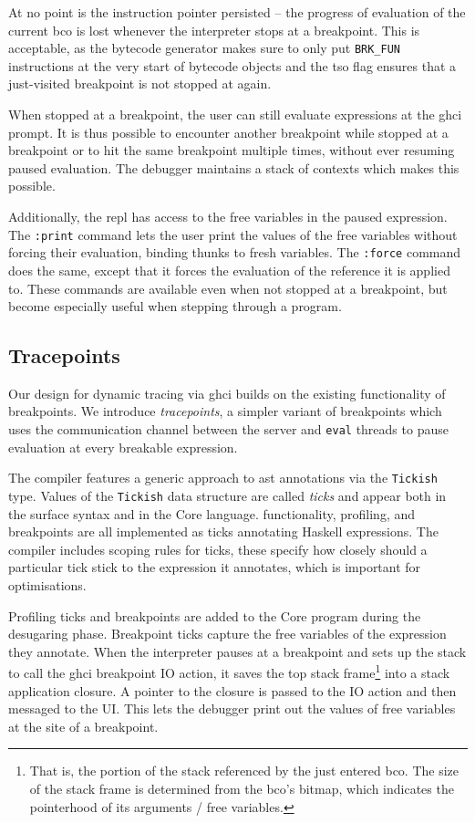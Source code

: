 \documentclass[thesis=B,english]{FITthesis}[2019/12/23]
\newcommand{\hsType}[1]{\texttt{#1}}
\begin{document}
At no point is the instruction pointer persisted -- the progress of evaluation
of the current \acrshort{bco} is lost whenever the interpreter stops at a
breakpoint. This is acceptable, as the bytecode generator makes sure to only
put \texttt{BRK\_FUN} instructions at the very start of bytecode objects and
the \acrshort{tso} flag ensures that a just-visited breakpoint is not stopped
at again.

When stopped at a breakpoint, the user can still evaluate expressions at the
\acrshort{ghci} prompt. It is thus possible to encounter another breakpoint
while stopped at a breakpoint or to hit the same breakpoint multiple times,
without ever resuming paused evaluation. The debugger maintains a stack of
contexts which makes this possible.

Additionally, the \acrshort{repl} has access to the free variables in the
paused expression. The \texttt{:print} command lets the user print the values
of the free variables without forcing their evaluation, binding thunks to fresh
variables. The \texttt{:force} command does the same, except that it forces the
evaluation of the reference it is applied to. These commands are available even
when not stopped at a breakpoint, but become especially useful when stepping
through a program.

\subsection*{Trace\-points}
Our design for dynamic tracing via \acrshort{ghci} builds on the existing
functionality of breakpoints. We introduce \textit{trace\-points}, a simpler
variant of breakpoints which uses the communication channel between the server
and \texttt{eval} threads to pause evaluation at every breakable expression.

The compiler features a generic approach to \acrshort{ast} annotations via the
\hsType{Tickish} type. Values of the \hsType{Tickish} data structure are called
\textit{ticks} and appear both in the surface syntax and in the Core language.
 functionality, profiling, and breakpoints are all implemented
as ticks annotating Haskell expressions. The compiler includes scoping rules
for ticks, these specify how closely should a particular tick stick to the
expression it annotates, which is important for optimisations.

Profiling ticks and breakpoints are added to the Core program during the
desugaring phase. Breakpoint ticks capture the free variables of the expression
they annotate. When the interpreter pauses at a breakpoint and sets up the
stack to call the \acrshort{ghci} breakpoint IO action, it saves the top stack
frame\footnote{That is, the portion of the stack referenced by the just entered
\acrshort{bco}. The size of the stack frame is determined from the
\acrshort{bco}'s bitmap, which indicates the pointerhood of its arguments /
free variables.} into a stack application closure. A pointer to the closure is
passed to the IO action and then messaged to the UI. This lets the debugger
print out the values of free variables at the site of a breakpoint.
\end{document}
